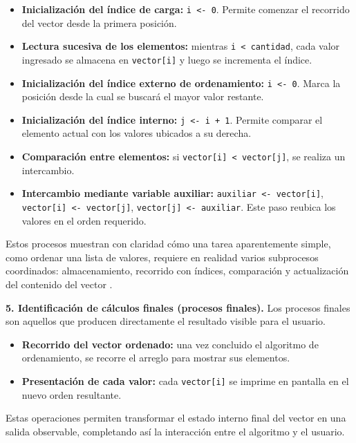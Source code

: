 \documentclass[12pt,twoside]{book}
\begin{document}
						\begin{itemize}
							\item \textbf{Inicialización del índice de carga:} \texttt{i <- 0}. Permite comenzar el recorrido del vector desde la primera posición.
							\item \textbf{Lectura sucesiva de los elementos:} mientras \texttt{i < cantidad}, cada valor ingresado se almacena en \texttt{vector[i]} y luego se incrementa el índice.
							\item \textbf{Inicialización del índice externo de ordenamiento:} \texttt{i <- 0}. Marca la posición desde la cual se buscará el mayor valor restante.
							\item \textbf{Inicialización del índice interno:} \texttt{j <- i + 1}. Permite comparar el elemento actual con los valores ubicados a su derecha.
							\item \textbf{Comparación entre elementos:} si \texttt{vector[i] < vector[j]}, se realiza un intercambio.
							\item \textbf{Intercambio mediante variable auxiliar:} \texttt{auxiliar <- vector[i]}, \texttt{vector[i] <- vector[j]}, \texttt{vector[j] <- auxiliar}. Este paso reubica los valores en el orden requerido.
						\end{itemize}
						
						\noindent
						Estos procesos muestran con claridad cómo una tarea aparentemente simple, como ordenar una lista de valores, requiere en realidad varios subprocesos coordinados: almacenamiento, recorrido con índices, comparación y actualización del contenido del vector \cite{Cormen2022Introduction,Sebesta2018Concepts}.
						
						\noindent
						\textbf{5. Identificación de cálculos finales (procesos finales).}
						Los procesos finales son aquellos que producen directamente el resultado visible para el usuario.
						
						\begin{itemize}
							\item \textbf{Recorrido del vector ordenado:} una vez concluido el algoritmo de ordenamiento, se recorre el arreglo para mostrar sus elementos.
							\item \textbf{Presentación de cada valor:} cada \texttt{vector[i]} se imprime en pantalla en el nuevo orden resultante.
						\end{itemize}
						
						\noindent
						Estas operaciones permiten transformar el estado interno final del vector en una salida observable, completando así la interacción entre el algoritmo y el usuario.
						
\end{document}
